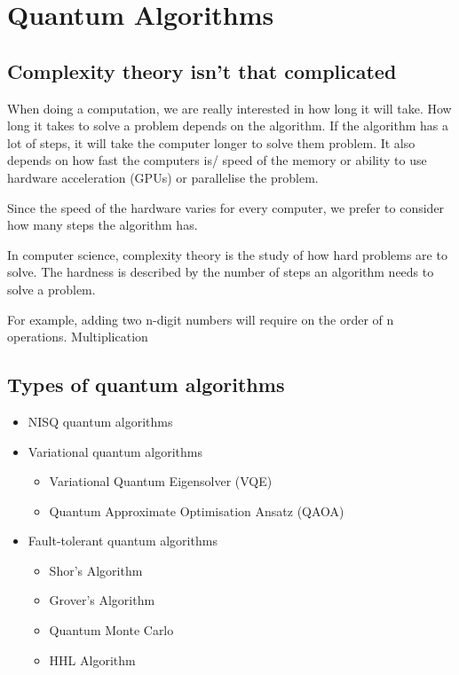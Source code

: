 \chapter{Quantum Algorithms}


\section{ Complexity theory isn't that complicated}

When doing a computation, we are really interested in how long it will take. How long it takes to solve a problem depends on the algorithm. If the algorithm has a lot of steps, it will take the computer longer to solve them problem. It also depends on how fast the computers is/ speed of the memory or ability to use hardware acceleration (GPUs) or parallelise the problem. 

Since the speed of the hardware varies for every computer, we prefer to consider how many steps the algorithm has. 

In computer science, complexity theory is the study of how hard problems are to solve. The hardness is described by the number of steps an algorithm needs to solve a problem.

For example, adding two n-digit numbers will require on the order of n operations. Multiplication 

\section{ Types of quantum algorithms} 


\begin{itemize}
    \item NISQ quantum algorithms
    \item Variational quantum algorithms
        \begin{itemize}
            \item Variational Quantum Eigensolver (VQE)
            \item Quantum Approximate Optimisation Ansatz (QAOA)
        \end{itemize}
    \item Fault-tolerant quantum algorithms
        \begin{itemize}
            \item Shor's Algorithm
            \item Grover's Algorithm
            \item Quantum Monte Carlo
            \item HHL Algorithm
        \end{itemize}
\end{itemize}

